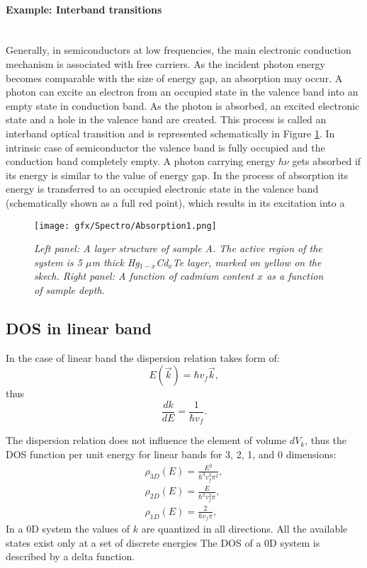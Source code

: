 \documentclass[titlepage,a4paper]{book}
\newcommand{\wciecie}{\quad\phantom{v}}
\newcommand{\myparagraph}[1]{\paragraph{#1}\mbox{}\\}
\begin{document}
\myparagraph{Example: Interband transitions}
\wciecie
Generally, in semiconductors at low frequencies, the main electronic conduction mechanism is associated with free carriers. As the incident photon energy becomes comparable with the size of energy gap, an absorption may occur. A photon can excite an electron from an occupied state in the valence band into an empty state in conduction band. As the photon is absorbed, an excited electronic state and a hole in the valence band are created. This process is called an interband optical transition and is represented schematically in Figure \ref{fig:Absorption1}. In intrinsic case of semiconductor the valence band is fully occupied and the conduction band completely empty. A photon carrying energy $h\nu$ gets absorbed if its energy is similar to the value of energy gap. In the process of absorption its energy is transferred to an occupied electronic state in the valence band (schematically shown as a full red point), which results in its excitation into a 


\begin{figure}[ht]
	\centering
	\texttt{[image: gfx/Spectro/Absorption1.png]}
	\vspace{-10pt}
	\caption{\textit{Left panel: A layer structure of sample A. The active region of the system is 5 $\mu$m thick Hg$_{1-x}$Cd$_x$Te layer, marked on yellow on the skech. Right panel: A function of cadmium content $x$ as a function of sample depth.}}
	\label{fig:Absorption1}
\end{figure} 

\subsection{DOS in linear band}
\wciecie
In the case of linear band the dispersion relation takes form of:
\begin{equation}
\label{eq:DOS_lin1}
E(\vec{k}) = \hbar v_f \vec{k},
\end{equation}
thus
\begin{equation}
\label{eq:DOS_lin2}
\frac{dk}{dE} = \frac{1}{\hbar v_f}.
\end{equation}

The dispersion relation does not influence the element of volume $dV_k$, thus the DOS function per unit energy for linear bands for 3, 2, 1, and 0 dimensions:
\begin{eqnarray}
\label{eq:DOS_lin4}
\rho_{3D}(E) = \frac{E^2}{\hbar^3 v_f^3 \pi^2}, \\
\rho_{2D}(E) = \frac{E}{\hbar^2 v_f^2 \pi},\\
\rho_{1D}(E) = \frac{2}{\hbar v_f \pi},
\end{eqnarray}
In a 0D system the values of $k$ are quantized in all directions. All the available states exist only at a set of discrete energies The DOS of a 0D system is described by a delta function. 
\end{document}
